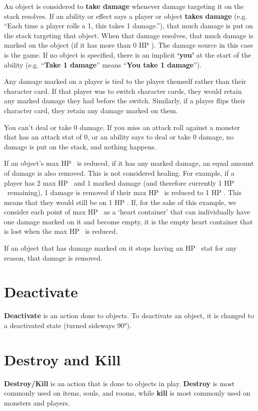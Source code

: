 \documentclass[
  fontsize=10pt,
  paper=a5,
  version=last,
  chapterprefix=true,
  bindingoffset=5mm,
  ]{scrbook}
\newcommand*{\inlineicon}[1]{%
    \raisebox{-.3\baselineskip}{%
        \smash{%
            \texttt{[image: \#1]}%
        }%
    }%
}
\newcommand{\heart}{\inlineicon{./assets/ms-heart.png}}
\begin{document}
    An object is considered to \textbf{take damage} whenever damage targeting it on the stack resolves. If an ability or effect says a player or object \textbf{takes damage} (e.g. “Each time a player rolls a 1, this takes 1 damage.”), that much damage is put on the stack targeting that object. When that damage resolves, that much damage is marked on the object (if it has more than 0 HP\heart). The damage source in this case is the game. If no object is specified, there is an implicit \textbf{‘you’} at the start of the ability (e.g. “\textbf{Take 1 damage}” means “\textbf{You take 1 damage}”).

    Any damage marked on a player is tied to the player themself rather than their character card. If that player was to switch character cards, they would retain any marked damage they had before the switch. Similarly, if a player flips their character card, they retain any damage marked on them.

    You can’t deal or take 0 damage. If you miss an attack roll against a monster that has an attack stat of 0, or an ability says to deal or take 0 damage, no damage is put on the stack, and nothing happens.

    If an object’s max HP\heart\ is reduced, if it has any marked damage, an equal amount of damage is also removed. This is not considered healing. For example, if a player has 2 max HP\heart\ and 1 marked damage (and therefore currently 1 HP\heart\ remaining), 1 damage is removed if their max HP\heart\ is reduced to 1 HP\heart. This means that they would still be on 1 HP\heart. If, for the sake of this example, we consider each point of max HP\heart\ as a ‘heart container’ that can individually have one damage marked on it and become empty, it is the empty heart container that is lost when the max HP\heart\ is reduced.

    If an object that has damage marked on it stops having an HP\heart\ stat for any reason, that damage is removed.
    \section{Deactivate}
    \textbf{Deactivate} is an action done to objects. To deactivate an object, it is changed to a deactivated state (turned sideways 90°).
    \section{Destroy and Kill}
    \label{destroy}
    \textbf{Destroy/Kill} is an action that is done to objects in play. \textbf{Destroy} is most commonly used on items, souls, and rooms, while \textbf{kill} is most commonly used on monsters and players.
\end{document}
